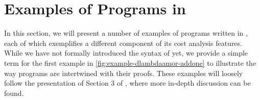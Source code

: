 

\section{Examples of Programs in \dlambdaamor}
\label{sec:dlambdaamor-examples}
In this section, we will present a number of examples of programs written in \dlambdaamor, each of which exemplifies a different component of its cost analysis features. While we have not formally introduced the syntax of \dlambdaamor yet, we provide a simple term for the first example in \autoref{fig:example-dlambdaamor-addone} to illustrate the way programs are intertwined with their proofs. These examples will loosely follow the presentation of Section 3 of \citet{rajani-et-al:popl21}, where more in-depth discussion can be found.

